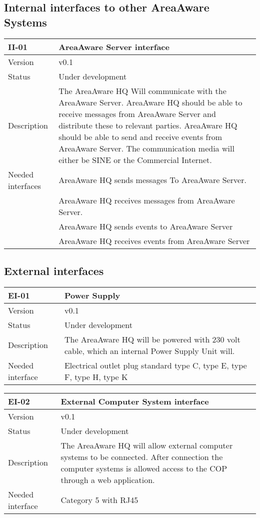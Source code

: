 \subsection{Internal interfaces to other AreaAware Systems}
\begin{longtable}{| p{3.5cm} |  p{10cm} | }
	\hline
	\textbf{II-01} &  \textbf{AreaAware Server interface } \\
	\hline
	Version & v0.1 \\
	\hline
	Status & Under development \\
	\hline
	Description & The AreaAware HQ Will communicate with the AreaAware Server. AreaAware HQ should be able to receive messages from AreaAware Server and distribute these to relevant parties. AreaAware HQ should be able to send and receive events from AreaAware Server. The communication media will either be SINE or the Commercial Internet. \\
	\hline
	 Needed interfaces & AreaAware HQ sends messages To AreaAware Server.  \\
				& AreaAware HQ receives messages from AreaAware Server. \\
				& AreaAware HQ sends events to AreaAware Server  \\
				& AreaAware HQ receives events from AreaAware Server  \\
	\hline
\end{longtable}

\subsection{External interfaces}
\begin{longtable}{| p{3.5cm} | p{10cm} | }
	\hline
	\textbf{EI-01} &  \textbf{Power Supply} \\
	\hline
	Version & v0.1 \\
	\hline
	Status & Under development \\
	\hline
	Description & The AreaAware HQ will be powered with 230 volt cable, which an internal Power Supply Unit will.\\
	\hline
	Needed interface &  Electrical outlet plug standard type C, type E,  type F,  type H, type K \\
	\hline
\end{longtable}

\begin{longtable}{| p{3.5cm} |  p{10cm} | }
	\hline
	\textbf{EI-02} &  \textbf{External Computer System interface} \\
	\hline
	Version & v0.1 \\
	\hline
	Status & Under development \\
	\hline
	Description & The AreaAware HQ will allow external computer systems to be connected. After connection the computer systems is allowed access to the COP through a web application.	\\
	\hline
	Needed interface & Category 5 with RJ45 \\
	\hline
\end{longtable}

